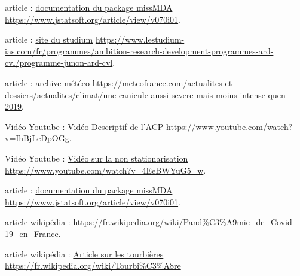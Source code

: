 \documentclass[a4paper,12pt]{report}%
\begin{document}
article : \href{https://www.jstatsoft.org/article/view/v070i01}{documentation du package missMDA} \newline
 \url{https://www.jstatsoft.org/article/view/v070i01}.\newline

article : \href{https://www.lestudium-ias.com/fr/programmes/ambition-research-development-programmes-ard-cvl/programme-junon-ard-cvl1}{site du studium} \newline
 \url{https://www.lestudium-ias.com/fr/programmes/ambition-research-development-programmes-ard-cvl/programme-junon-ard-cvl}.\newline

article : \href{https://meteofrance.com/actualites-et-dossiers/actualites/climat/une-canicule-aussi-severe-mais-moins-intense-quen-2019}{archive météeo} \newline
 \url{https://meteofrance.com/actualites-et-dossiers/actualites/climat/une-canicule-aussi-severe-mais-moins-intense-quen-2019}.\newline

Vidéo Youtube : \href{https://www.youtube.com/watch?v=IhBjLeDpOGg}{Vidéo Descriptif de l'ACP} \newline
 \url{https://www.youtube.com/watch?v=IhBjLeDpOGg}.\newline

Vidéo Youtube : \href{https://www.youtube.com/watch?v=4EeBWYuG5_w}{Vidéo sur la non stationarisation} \newline
 \url{https://www.youtube.com/watch?v=4EeBWYuG5_w}.\newline

article : \href{https://www.jstatsoft.org/article/view/v070i01}{documentation du package missMDA} \newline
 \url{https://www.jstatsoft.org/article/view/v070i01}.\newline

article wikipédia : \href{hhttps://fr.wikipedia.org/wiki/Pand\%C3\%A9mie_de_Covid-19_en_France}{} \newline
 \url{https://fr.wikipedia.org/wiki/Pand%C3%A9mie_de_Covid-19_en_France}.\newline

article wikipédia : \href{https://fr.wikipedia.org/wiki/Tourbi%C3%A8re}{Article sur les tourbières} \newline
 \url{https://fr.wikipedia.org/wiki/Tourbi%C3%A8re} \newline
\end{document}
